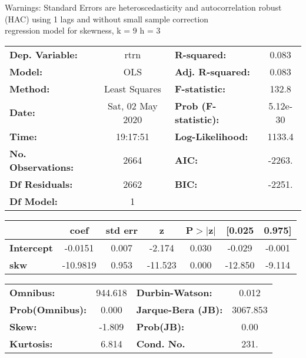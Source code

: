 Warnings: \newline
 [1] Standard Errors are heteroscedasticity and autocorrelation robust (HAC) using 1 lags and without small sample correction\\ 

regression model for skewness, k = 9 h = 3\begin{center}
\begin{tabular}{lclc}
\toprule
\textbf{Dep. Variable:}    &       rtrn       & \textbf{  R-squared:         } &     0.083   \\
\textbf{Model:}            &       OLS        & \textbf{  Adj. R-squared:    } &     0.083   \\
\textbf{Method:}           &  Least Squares   & \textbf{  F-statistic:       } &     132.8   \\
\textbf{Date:}             & Sat, 02 May 2020 & \textbf{  Prob (F-statistic):} &  5.12e-30   \\
\textbf{Time:}             &     19:17:51     & \textbf{  Log-Likelihood:    } &    1133.4   \\
\textbf{No. Observations:} &        2664      & \textbf{  AIC:               } &    -2263.   \\
\textbf{Df Residuals:}     &        2662      & \textbf{  BIC:               } &    -2251.   \\
\textbf{Df Model:}         &           1      & \textbf{                     } &             \\
\bottomrule
\end{tabular}
\begin{tabular}{lcccccc}
                   & \textbf{coef} & \textbf{std err} & \textbf{z} & \textbf{P$> |$z$|$} & \textbf{[0.025} & \textbf{0.975]}  \\
\midrule
\textbf{Intercept} &      -0.0151  &        0.007     &    -2.174  &         0.030        &       -0.029    &       -0.001     \\
\textbf{skw}       &     -10.9819  &        0.953     &   -11.523  &         0.000        &      -12.850    &       -9.114     \\
\bottomrule
\end{tabular}
\begin{tabular}{lclc}
\textbf{Omnibus:}       & 944.618 & \textbf{  Durbin-Watson:     } &    0.012  \\
\textbf{Prob(Omnibus):} &   0.000 & \textbf{  Jarque-Bera (JB):  } & 3067.853  \\
\textbf{Skew:}          &  -1.809 & \textbf{  Prob(JB):          } &     0.00  \\
\textbf{Kurtosis:}      &   6.814 & \textbf{  Cond. No.          } &     231.  \\
\bottomrule
\end{tabular}
\end{center}

